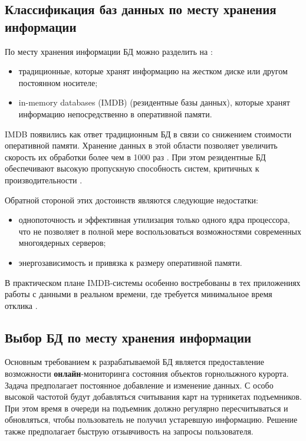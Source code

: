 \clearpage
\subsection{Классификация баз данных по месту хранения информации}

По месту хранения информации БД можно разделить на \cite{inmemory}:
\begin{itemize}
	\item традиционные, которые хранят информацию на жестком диске или другом постоянном носителе; 
	\item in-memory databases (IMDB) (резидентные базы данных), которые хранят информацию непосредственно в оперативной памяти.
\end{itemize}

IMDB появились как ответ традиционным БД в связи со снижением стоимости оперативной памяти. Хранение данных в этой области позволяет увеличить скорость их обработки более чем в 1000 раз \cite{why}. При этом резидентные БД обеспечивают высокую пропускную способность систем, критичных к производительности \cite{adv}.

Обратной стороной этих достоинств являются следующие недостатки:
\begin{itemize}
	\item однопоточность и эффективная утилизация только одного ядра процессора, что не позволяет в полной мере воспользоваться возможностями современных многоядерных серверов;
	\item энергозависимость и привязка к размеру оперативной памяти.
\end{itemize}

В практическом плане IMDB-системы особенно востребованы в тех приложениях работы с данными в реальном времени, где требуется минимальное время отклика \cite{lookslike}.

\subsection{Выбор БД по месту хранения информации}
Основным требованием к разрабатываемой БД является предоставление возможности \textbf{онлайн}-мониторинга состояния объектов горнолыжного курорта. Задача предполагает постоянное добавление и изменение данных. С особо высокой частотой будут добавляться считывания карт на турникетах подъемников. При этом время в очереди на подъемник должно регулярно пересчитываться и обновляться, чтобы пользователь не получил устаревшую информацию. Решение также предполагает быструю отзывчивость на запросы пользователя.  

